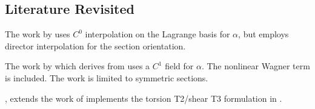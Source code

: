 \subsection{Literature Revisited}

The work by \cite{gruttmann2000theory} uses \(C^0\) interpolation on the Lagrange basis for \(\alpha\), but employs director interpolation for the section orientation.

\cite{hsiao1999consistent,hsiao2000corotational}

The work by \cite{zhang2011formulation} which derives from \cite{alemdar2001distributed} uses a \(C^1\) field for \(\alpha\). The nonlinear Wagner term is included. The work is limited to symmetric sections.

\cite{rinchen2016formulation}, \cite{rinchen2020geometric} extends the work of \cite{zhang2011formulation} implements the torsion T2/shear T3 formulation in \OpenSees{}. 

